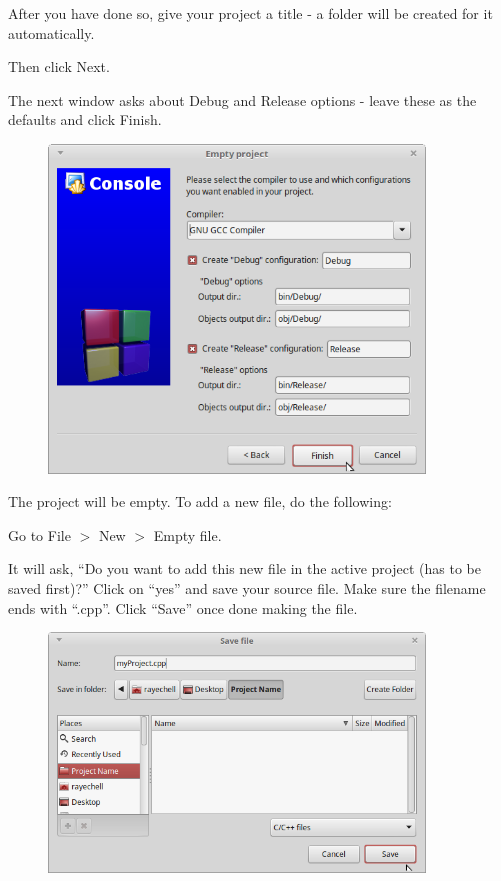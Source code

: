                 After you have done so, give your project a title - a folder will be created for it automatically.

                Then click Next.

                \newpage

                The next window asks about Debug and Release options - leave these as the defaults and click Finish.
            
                \begin{figure}[h]
                    \centering
                    \includegraphics[width=10cm]{images-2018-01/codeblocks_debugrelease.png}
                \end{figure}

                The project will be empty. To add a new file, do the following:

                Go to File $>$ New $>$ Empty file.

                It will ask, ``Do you want to add this new file in the active project (has to be saved first)?''
                Click on ``yes'' and save your source file. Make sure the filename ends with ``.cpp''.
                Click ``Save'' once done making the file.
            
                \begin{figure}[h]
                    \centering
                    \includegraphics[width=10cm]{images-2018-01/codeblocks_newfile.png}
                \end{figure}

